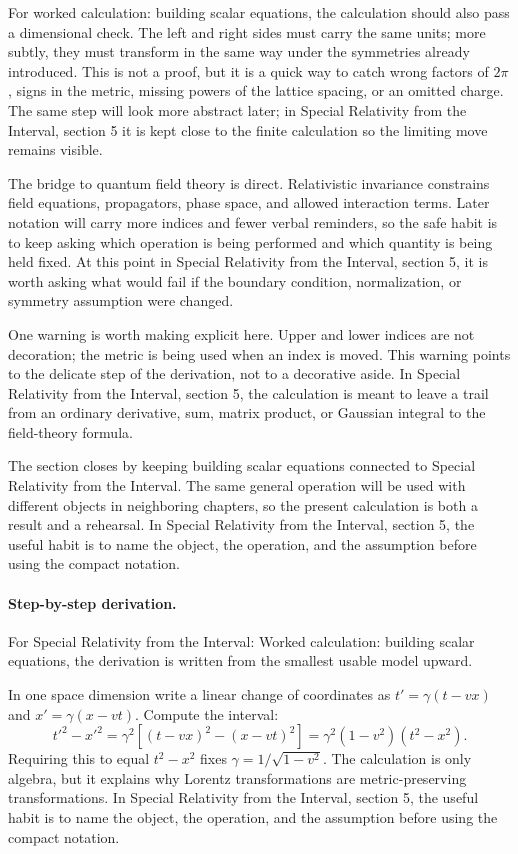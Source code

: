 For worked calculation: building scalar equations, the calculation should also pass a dimensional check.  The left and right sides must carry the same units; more subtly, they must transform in the same way under the symmetries already introduced.  This is not a proof, but it is a quick way to catch wrong factors of \(2\pi\), signs in the metric, missing powers of the lattice spacing, or an omitted charge.  The same step will look more abstract later; in Special Relativity from the Interval, section 5 it is kept close to the finite calculation so the limiting move remains visible.

The bridge to quantum field theory is direct.  Relativistic invariance constrains field equations, propagators, phase space, and allowed interaction terms.  Later notation will carry more indices and fewer verbal reminders, so the safe habit is to keep asking which operation is being performed and which quantity is being held fixed.  At this point in Special Relativity from the Interval, section 5, it is worth asking what would fail if the boundary condition, normalization, or symmetry assumption were changed.

One warning is worth making explicit here.  Upper and lower indices are not decoration; the metric is being used when an index is moved.  This warning points to the delicate step of the derivation, not to a decorative aside.  In Special Relativity from the Interval, section 5, the calculation is meant to leave a trail from an ordinary derivative, sum, matrix product, or Gaussian integral to the field-theory formula.

The section closes by keeping building scalar equations connected to Special Relativity from the Interval.  The same general operation will be used with different objects in neighboring chapters, so the present calculation is both a result and a rehearsal.  In Special Relativity from the Interval, section 5, the useful habit is to name the object, the operation, and the assumption before using the compact notation.



\paragraph{Step-by-step derivation.}

For Special Relativity from the Interval: Worked calculation: building scalar equations, the derivation is written from the smallest usable model upward.

In one space dimension write a linear change of coordinates as \(t'=\gamma(t-vx)\) and \(x'=\gamma(x-vt)\).  Compute the interval:
\[
  t'^2-x'^2
  =
  \gamma^2[(t-vx)^2-(x-vt)^2]
  =
  \gamma^2(1-v^2)(t^2-x^2).
\]
Requiring this to equal \(t^2-x^2\) fixes \(\gamma=1/\sqrt{1-v^2}\).  The calculation is only algebra, but it explains why Lorentz transformations are metric-preserving transformations.  In Special Relativity from the Interval, section 5, the useful habit is to name the object, the operation, and the assumption before using the compact notation.

